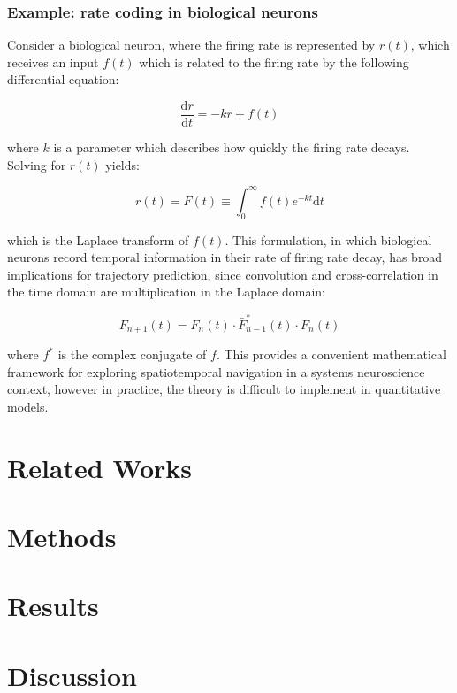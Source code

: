 \documentclass{article}
\begin{document}
\subsubsection{Example: rate coding in biological neurons}

Consider a biological neuron, where the firing rate is represented by $r(t)$,
which receives an input $f(t)$ which is related to the firing rate by the following differential equation:

\begin{equation}
  \frac{\mathrm{d}r}{\mathrm{d}t} = - k r + f(t)
\end{equation}

where $k$ is a parameter which describes how quickly the firing rate decays.
Solving for $r(t)$ yields:

\begin{equation}
  r(t) = F(t) \equiv \int_0^\infty f(t) e^{-kt} \mathrm{d}t
\end{equation}

which is the Laplace transform of $f(t)$.
This formulation, in which biological neurons record temporal information in their rate of firing rate decay,
has broad implications for trajectory prediction,
since convolution and cross-correlation in the time domain are multiplication in the Laplace domain:

\begin{equation}
  F_{n+1}(t) = F_n(t) \cdot \bar{F}^*_{n-1}(t) \cdot F_n(t)
\end{equation}

where $f^*$ is the complex conjugate of $f$.
This provides a convenient mathematical framework for exploring spatiotemporal navigation in a systems neuroscience context,
however in practice, the theory is difficult to implement in quantitative models.


\section{Related Works}

\section{Methods}

\section{Results}

\section{Discussion}
\end{document}
